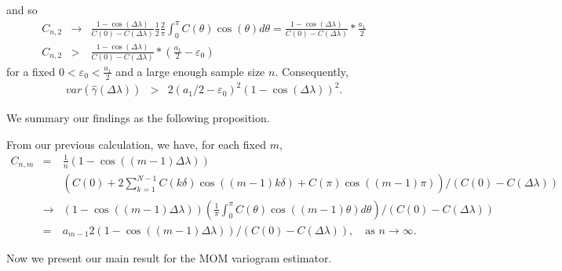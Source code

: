 and so
\begin{eqnarray*}
C_{n, 2} &\to& \frac{1 - \cos(\Delta \lambda)}{C(0) - C(\Delta \lambda)} \frac{1}{2} \frac{2}{\pi}\int_0^\pi C(\theta)\cos(\theta)d\theta = \frac{1 - \cos(\Delta \lambda)}{C(0) - C(\Delta \lambda)}*\frac{a_1}{2} \\
C_{n, 2} &>& \frac{1 - \cos(\Delta \lambda)}{C(0) - C(\Delta \lambda)}*(\frac{a_1}{2} - \varepsilon_0)
\end{eqnarray*}
for a fixed $0 < \varepsilon_0 < \frac{a_1}{2}$ and a large enough sample size $n$. Consequently,
\begin{eqnarray*}
var(\hat{\gamma}(\Delta \lambda)) &>& 2(a_1/2 - \varepsilon_0)^2(1 - \cos(\Delta \lambda))^2.
\end{eqnarray*}

We summary our findings as the following proposition.


From our previous calculation, we have, for each fixed $m$,
\begin{eqnarray*}
C_{n, m} &=& \frac{1}{n}(1 - \cos((m-1)\Delta \lambda)) \\
& &\left(C(0) + 2\sum_{k = 1}^{N-1}C(k\delta)\cos((m-1)k\delta) + C(\pi)\cos((m-1)\pi)\right)/(C(0)-C(\Delta \lambda)) \\
& \to & (1 - \cos((m-1)\Delta \lambda)) \left(\frac{1}{\pi}\int_0^\pi C(\theta)\cos((m-1)\theta)d\theta\right)/(C(0)-C(\Delta \lambda)) \\
&=& {a_{m-1}}{2}(1 - \cos((m-1)\Delta \lambda))/(C(0)-C(\Delta \lambda)), \quad \mbox{as $n \to \infty$.}
\end{eqnarray*}

Now we present our main result for the MOM variogram estimator.


